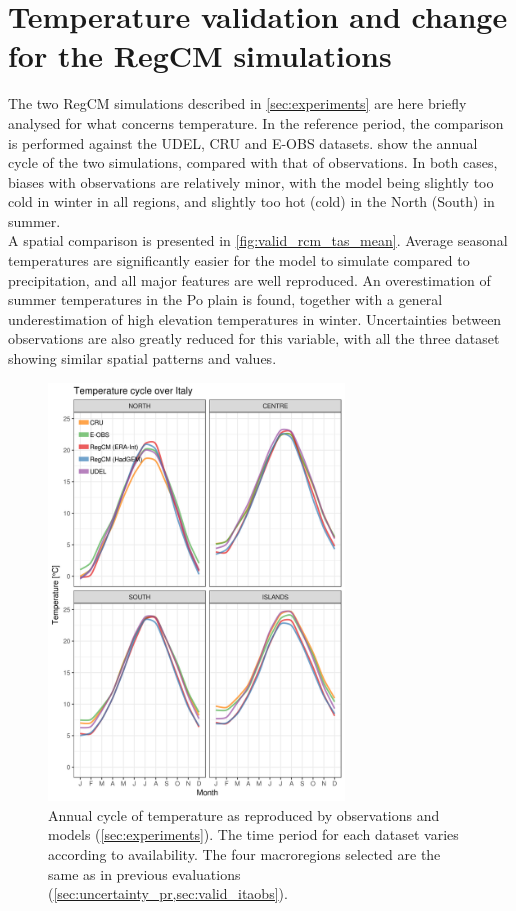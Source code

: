 \chapter{Temperature validation and change for the RegCM simulations}  \label{appendix_tas}
The two RegCM simulations described in \cref{sec:experiments} are here briefly analysed for what concerns temperature.
In the reference period, the comparison is performed against the UDEL\citep{Willmott2001}, CRU\citep{Harris2014} and E-OBS \citep{Haylock2008} datasets.
 show the annual cycle of the two simulations, compared with that of observations.
In both cases, biases with observations are relatively minor, with the model being slightly too cold in winter in all regions, and slightly too hot (cold) in the North (South) in summer.\\
A spatial comparison is presented in \cref{fig:valid_rcm_tas_mean}. Average seasonal temperatures are significantly easier for the model to simulate compared to precipitation, and all major features are well reproduced.
An overestimation of summer temperatures in the Po plain is found, together with a general underestimation of high elevation temperatures in winter.
Uncertainties between observations are also greatly reduced for this variable, with all the three dataset showing similar spatial patterns and values.
\begin{figure}
    \centering
    \includegraphics[width=0.7\textwidth]{figures/valid_rcm/tas/ac}
    \decoRule
    \caption[Validation of temperature annual cycle]{
        Annual cycle of temperature as reproduced by observations and models (\cref{sec:experiments}). The time period for each dataset varies according to availability. The four macroregions selected are the same as in previous evaluations (\cref{sec:uncertainty_pr,sec:valid_itaobs}).
    }\label{fig:valid_rcm_tas_ac}
\end{figure}
